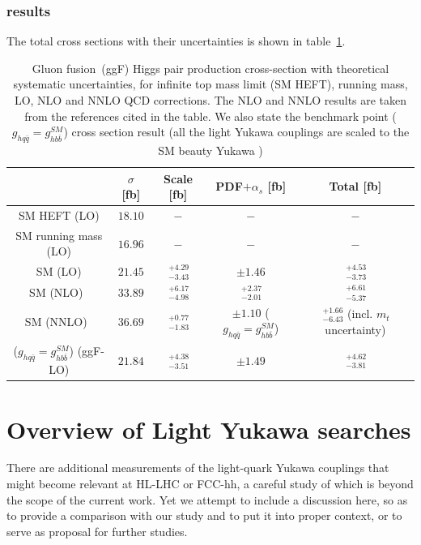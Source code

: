 \subsubsection{results}
The total cross sections with their uncertainties is shown in table~\ref{ggf_xsres}.
%
\begin{table}
	\centering
	\begin{tabular}{ccccc}
		\toprule
		& $ \sigma$	[fb] & Scale [fb] & PDF$+\alpha_s$ [fb]& Total [fb] \\
		\midrule
		SM HEFT  (LO)      &  $ 18.10$    &   $-$      & $-$   &  $-$ \\
		SM   running mass (LO)  &  $ 16.96$    &   $ -$   & $-$   &  $-$ \\
		SM    (LO)  &  $ 21.45$    &   $ \,^{+4.29}_{-3.43}$   & $\pm 1.46$   &  $ \,^{+4.53}_{-3.73}$ \\
		SM   (NLO)~\cite{Baglio:2012np}  &  $ 33.89$   &   $ \,^{+6.17}_{-4.98}$   & $ \,^{+2.37}_{-2.01}$   &  $ \,^{+6.61}_{-5.37}$ \\
		SM   (NNLO)~\cite{Grazzini:2018bsd}  &  $36.69$    &    $ \,^{+0.77}_{-1.83}$   & $\pm 1.10$    ($g_{hq \bar q} = g_{h b \bar b}^{SM}$) &  $ \,^{+1.66}_{-6.43}$ {\tiny(incl. $m_t$ uncertainty)} \\
		($g_{hq \bar q} = g_{h b \bar b}^{SM}$)  (ggF-LO)  &  $ 21.84$    &  $ \,^{+4.38}_{-3.51}$   & $\pm 1.49$   &  $ \,^{+4.62}_{-3.81}$ \\
		\bottomrule
	\end{tabular}
	\label{ggf_xsres}
	\caption{Gluon fusion~(ggF) Higgs pair production cross-section with theoretical systematic uncertainties, for infinite top mass limit (SM HEFT), running mass, LO, NLO and NNLO QCD corrections. The NLO and NNLO results are taken from the references cited in the table. We also state the benchmark point ($g_{hq \bar q} = g_{h b \bar b}^{SM}$)  cross section result (all the light Yukawa couplings are scaled to the SM beauty Yukawa )}
\end{table}
\section{Overview of Light Yukawa searches}
There are additional measurements of the light-quark Yukawa couplings that might become relevant at HL-LHC or FCC-hh, a careful study of which is beyond the scope of the current work. Yet we attempt to include a discussion here, so as to provide a comparison with our study and to put it into proper context, or to serve as proposal for further studies.

